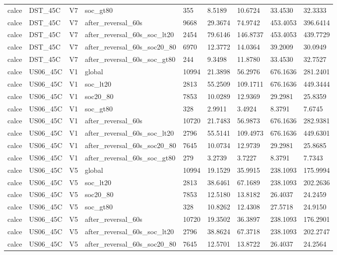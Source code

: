 \begin{tabular}{lllllllll}
calce & DST\_45C & V7 & soc\_gt80 & 355 & 8.5189 & 10.6724 & 33.4530 & 32.3333 \\
calce & DST\_45C & V7 & after\_reversal\_60s & 9668 & 29.3674 & 74.9742 & 453.4053 & 396.6414 \\
calce & DST\_45C & V7 & after\_reversal\_60s\_soc\_lt20 & 2454 & 79.6146 & 146.8737 & 453.4053 & 439.7729 \\
calce & DST\_45C & V7 & after\_reversal\_60s\_soc20\_80 & 6970 & 12.3772 & 14.0364 & 39.2009 & 30.0949 \\
calce & DST\_45C & V7 & after\_reversal\_60s\_soc\_gt80 & 244 & 9.3498 & 11.8780 & 33.4530 & 32.7527 \\
calce & US06\_45C & V1 & global & 10994 & 21.3898 & 56.2976 & 676.1636 & 281.2401 \\
calce & US06\_45C & V1 & soc\_lt20 & 2813 & 55.2509 & 109.1711 & 676.1636 & 449.3444 \\
calce & US06\_45C & V1 & soc20\_80 & 7853 & 10.0289 & 12.9369 & 29.2981 & 25.8359 \\
calce & US06\_45C & V1 & soc\_gt80 & 328 & 2.9911 & 3.4924 & 8.3791 & 7.6745 \\
calce & US06\_45C & V1 & after\_reversal\_60s & 10720 & 21.7483 & 56.9873 & 676.1636 & 282.9381 \\
calce & US06\_45C & V1 & after\_reversal\_60s\_soc\_lt20 & 2796 & 55.5141 & 109.4973 & 676.1636 & 449.6301 \\
calce & US06\_45C & V1 & after\_reversal\_60s\_soc20\_80 & 7645 & 10.0734 & 12.9739 & 29.2981 & 25.8685 \\
calce & US06\_45C & V1 & after\_reversal\_60s\_soc\_gt80 & 279 & 3.2739 & 3.7227 & 8.3791 & 7.7343 \\
calce & US06\_45C & V5 & global & 10994 & 19.1529 & 35.9915 & 238.1093 & 175.9994 \\
calce & US06\_45C & V5 & soc\_lt20 & 2813 & 38.6461 & 67.1689 & 238.1093 & 202.2636 \\
calce & US06\_45C & V5 & soc20\_80 & 7853 & 12.5180 & 13.8182 & 26.4037 & 24.2459 \\
calce & US06\_45C & V5 & soc\_gt80 & 328 & 10.8262 & 12.4308 & 27.5718 & 24.9150 \\
calce & US06\_45C & V5 & after\_reversal\_60s & 10720 & 19.3502 & 36.3897 & 238.1093 & 176.2901 \\
calce & US06\_45C & V5 & after\_reversal\_60s\_soc\_lt20 & 2796 & 38.8624 & 67.3718 & 238.1093 & 202.2747 \\
calce & US06\_45C & V5 & after\_reversal\_60s\_soc20\_80 & 7645 & 12.5701 & 13.8722 & 26.4037 & 24.2564 \\

\end{tabular}
